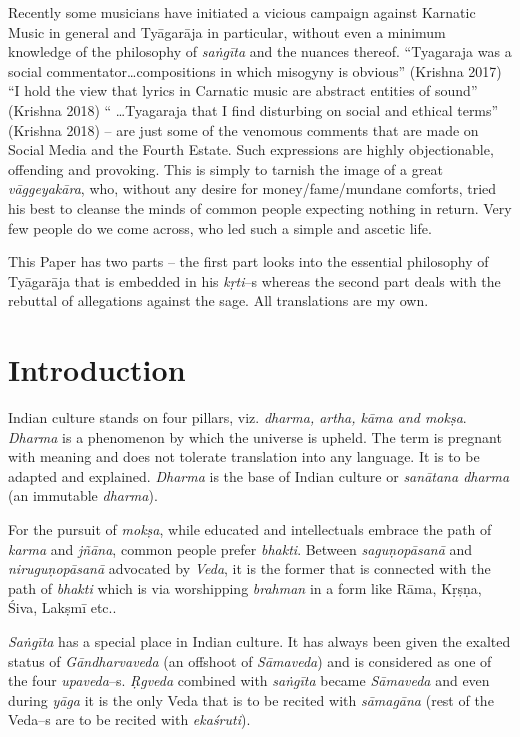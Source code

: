 Recently some musicians have initiated a vicious campaign against Karnatic Music in general and Tyāgarāja in particular, without even a minimum knowledge of the philosophy of \textit{saṅgīta} and the nuances thereof. “Tyagaraja was a social commentator…compositions in which misogyny is obvious” (Krishna 2017) “I hold the view that lyrics in Carnatic music are abstract entities of sound” (Krishna 2018) “ …Tyagaraja that I find disturbing on social and ethical terms” (Krishna 2018) – are just some of the venomous comments that are made on Social Media and the Fourth Estate. Such expressions are highly objectionable, offending and provoking. This is simply to tarnish the image of a great \textit{vāggeyakāra}, who, without any desire for money/fame/mundane comforts, tried his best to cleanse the minds of common people expecting nothing in return. Very few people do we come across, who led such a simple and ascetic life. 

This Paper has two parts – the first part looks into the essential philosophy of Tyāgarāja that is embedded in his \textit{kṛti}–s whereas the second part deals with the rebuttal of allegations against the sage. All translations are my own.  


\section*{Introduction}

Indian culture stands on four pillars, viz. \textit{dharma, artha, kāma and mokṣa}. \textit{Dharma} is a phenomenon by which the universe is upheld. The term is pregnant with meaning and does not tolerate translation into any language. It is to be adapted and explained. \textit{Dharma} is the base of Indian culture or \textit{sanātana dharma} (an immutable \textit{dharma}). 

For the pursuit of \textit{mokṣa}, while educated and intellectuals embrace the path of \textit{karma} and \textit{jñāna}, common people prefer \textit{bhakti}. Between \textit{saguṇopāsanā} and \textit{niruguṇopāsanā} advocated by \textit{Veda}, it is the former that is connected with the path of \textit{bhakti} which is via worshipping \textit{brahman} in a form like Rāma, Kṛṣṇa, Śiva, Lakṣmī etc..

\textit{Saṅgīta} has a special place in Indian culture. It has always been given the exalted status of \textit{Gāndharvaveda} (an offshoot of \textit{Sāmaveda}) and is considered as one of the four \textit{upaveda}–s. \textit{Ṛgveda} combined with \textit{saṅgīta} became \textit{Sāmaveda} and even during \textit{yāga} it is the only Veda that is to be recited with \textit{sāmagāna} (rest of the Veda–s are to be recited with \textit{ekaśruti}).

